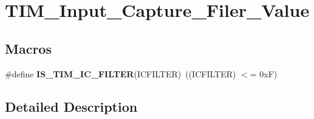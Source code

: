 \hypertarget{group___t_i_m___input___capture___filer___value}{}\section{T\+I\+M\+\_\+\+Input\+\_\+\+Capture\+\_\+\+Filer\+\_\+\+Value}
\label{group___t_i_m___input___capture___filer___value}
\subsection*{Macros}
\begin{DoxyCompactItemize}
\item 
\hypertarget{group___t_i_m___input___capture___filer___value_ga19ecc5fc2e1ce1697c3dbbb9809ca243}{}\#define {\bfseries I\+S\+\_\+\+T\+I\+M\+\_\+\+I\+C\+\_\+\+F\+I\+L\+T\+E\+R}(I\+C\+F\+I\+L\+T\+E\+R)~((I\+C\+F\+I\+L\+T\+E\+R) $<$= 0x\+F)\label{group___t_i_m___input___capture___filer___value_ga19ecc5fc2e1ce1697c3dbbb9809ca243}

\end{DoxyCompactItemize}


\subsection{Detailed Description}
